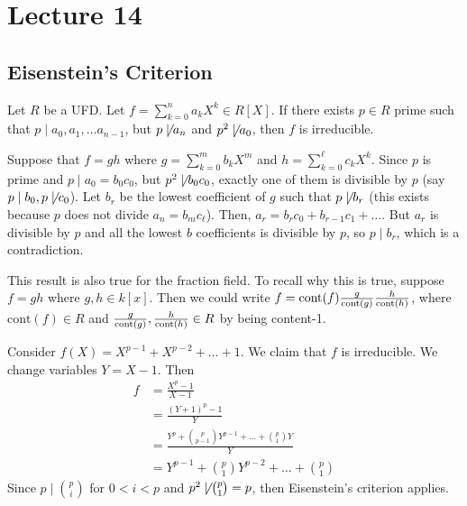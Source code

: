 \section{Lecture 14}
\subsection{Eisenstein's Criterion}
\begin{theorem}[Eisentein]
    Let $R$ be a UFD. Let $f = \sum_{k = 0}^n a_k X^k \in R[X]$.
    If there exists $p \in R$ prime
    such that $p \mid a_0, a_1, \dots a_{n - 1}$, but $p \not\mid a_n$
    and $p^2 \not\mid a_0$, then $f$ is irreducible.
    \begin{proof*}
        Suppose that $f = gh$ where $g = \sum_{k = 0}^m b_k X^m$ and $h = \sum_{k = 0}^{\ell} c_k X^k$.
        Since $p$ is prime and $p \mid a_0 = b_0 c_0$, but $p^2 \not\mid b_0 c_0$,
        exactly one of them is divisible by $p$ (say $p \mid b_0, p \not\mid c_0$).
        Let $b_r$ be the lowest coefficient of $g$ such that $p \not\mid b_r$ (this exists because $p$ does not divide $a_n = b_m c_{\ell}$).
        Then, $a_r = b_r c_0 + b_{r - 1} c_1 + \dots$. But $a_r$ is divisible
        by $p$ and all the lowest $b$ coefficients is divisible by $p$, so $p \mid b_r$, which is a contradiction.
    \end{proof*}
\end{theorem}
This result is also true for the fraction field. To recall why this is true, suppose $f = gh$ where $g, h \in k[x]$.
Then we could write $f = \text{cont}(f) \frac{g}{\operatorname{cont}(g)} \frac{h}{\operatorname{cont}(h)}$,
where $\text{cont}(f) \in R$ and $\frac{g}{\operatorname{cont}(g)}, \frac{h}{\operatorname{cont}(h)} \in R$ by being content-1.

\begin{example}
    Consider $f(X) = X^{p - 1} + X^{p - 2} + \dots + 1$. We claim that $f$ is irreducible.
    We change variables $Y = X - 1$.
    Then 
    \begin{align*}
        f &= \frac{X^p - 1}{X - 1} \\
        &= \frac{(Y + 1)^p - 1}{Y} \\
        &= \frac{Y^p + \binom{p}{p-1} Y^{p - 1} + \dots + \binom{p}{1} Y }{Y} \\
        &= Y^{p - 1} + \binom{p}{1} Y^{p - 2} + \dots + \binom{p}{1}
    \end{align*}
    Since $p \mid \binom{p}{i}$ for $0 < i < p$ and $p^2 \not\mid \binom{p}{1} = p$, then Eisenstein's criterion applies.
\end{example}

